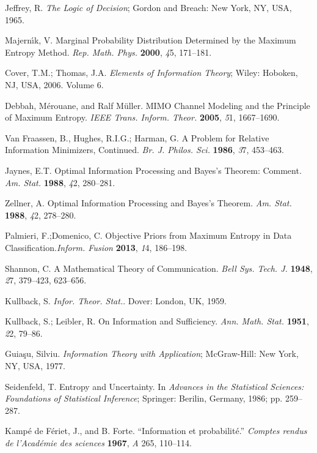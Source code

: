 \documentclass[entropy,article,accept,oneauthor,pdftex,12pt,a4paper]{mdpi}
\begin{document}
\begin{thebibliography}{----}

 Jeffrey, R. \emph{The Logic of Decision}; Gordon and Breach: New York, NY, USA, 1965.

 Majern{\'\i}k, V. Marginal Probability Distribution Determined by the Maximum Entropy Method. \emph{Rep. Math. Phys.} {\bf2000}, {\emph45},   171--181.

Cover, T.M.; Thomas, J.A.  \emph{Elements of Information Theory}; Wiley: Hoboken, NJ, USA, 2006. Volume 6.

 Debbah, M{\'e}rouane, and Ralf M{\"u}ller. MIMO Channel Modeling and the Principle of Maximum Entropy. \emph{IEEE Trans. Inform. Theor.} {\bf 2005}, {\emph51}, 1667--1690.

 Van Fraassen, B., Hughes, R.I.G.; Harman, G. A Problem for Relative Information Minimizers, Continued. \emph{Br. J. Philos. Sci.} {\bf1986},  {\emph37}, 453--463.

 Jaynes, E.T. Optimal Information Processing and Bayes's Theorem: Comment. \emph{Am. Stat.} {\bf1988}, {\emph42}, 280--281.

 Zellner, A. Optimal Information Processing and Bayes's Theorem. \emph{Am. Stat.} {\bf1988}, {\emph42}, 278--280.

 Palmieri, F.;Domenico, C. Objective Priors from Maximum Entropy in Data Classification.\emph{Inform. Fusion}  {\bf2013}, {\emph14}, 186--198.

 Shannon, C. A Mathematical Theory of Communication. \emph{Bell Sys. Tech. J.} {\bf1948}, {\emph27}, 379--423, 623--656.

 Kullback, S. \emph{Infor. Theor. Stat.}. Dover: London, UK, 1959.

 Kullback, S.;  Leibler, R. On Information and Sufficiency. \emph{Ann. Math. Stat.} {\bf1951}, {\emph22}, 79--86.

 Guia{\c{s}}u, Silviu. \emph{Information Theory with Application}; McGraw-Hill: New York, NY, USA, 1977. 

 Seidenfeld, T. Entropy and Uncertainty. In \emph{Advances in the Statistical Sciences: Foundations of Statistical Inference}; Springer: Berilin, Germany, 1986; pp. 259--287.

 Kamp{\'e} de F{\'e}riet, J., and B. Forte. ``Information et probabilit{\'e}.'' \emph{Comptes rendus de l'Acad{\'e}mie des sciences} {\bf1967}, {\emph A 265}, 110--114.


\end{thebibliography}
\end{document}
